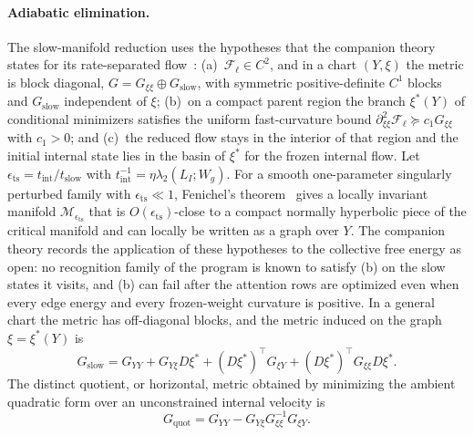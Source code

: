 \documentclass[11pt]{article}
\begin{document}
\paragraph{Adiabatic elimination.}
The slow-manifold reduction uses the hypotheses that the companion theory states for its rate-separated flow~\cite[Ch.~8]{DennisGaugeVFE2026}: (a)~$\mathcal{F}_\ell\in C^2$, and in a chart $(Y,\xi)$ the metric is block diagonal, $G=G_{\xi\xi}\oplus G_{\mathrm{slow}}$, with symmetric positive-definite $C^1$ blocks and $G_{\mathrm{slow}}$ independent of $\xi$; (b)~on a compact parent region the branch $\xi^*(Y)$ of conditional minimizers satisfies the uniform fast-curvature bound $\partial^2_{\xi\xi}\mathcal{F}_\ell\succeq c_1G_{\xi\xi}$ with $c_1>0$; and (c)~the reduced flow stays in the interior of that region and the initial internal state lies in the basin of $\xi^*$ for the frozen internal flow. Let $\epsilon_{\mathrm{ts}}=t_{\mathrm{int}}/t_{\mathrm{slow}}$ with $t_{\mathrm{int}}^{-1}=\eta\lambda_2(L_I;W_g)$. For a smooth one-parameter singularly perturbed family with $\epsilon_{\mathrm{ts}}\ll1$, Fenichel's theorem~\cite{fenichel1979geometric} gives a locally invariant manifold $\mathcal{M}_{\epsilon_{\mathrm{ts}}}$ that is $O(\epsilon_{\mathrm{ts}})$-close to a compact normally hyperbolic piece of the critical manifold and can locally be written as a graph over $Y$. The companion theory records the application of these hypotheses to the collective free energy as open: no recognition family of the program is known to satisfy (b) on the slow states it visits, and (b) can fail after the attention rows are optimized even when every edge energy and every frozen-weight curvature is positive. In a general chart the metric has off-diagonal blocks, and the metric induced on the graph $\xi=\xi^*(Y)$ is
\begin{equation}
G_{\mathrm{slow}}=G_{YY}+G_{Y\xi}D\xi^*+(D\xi^*)^\top G_{\xi Y}+(D\xi^*)^\top G_{\xi\xi}D\xi^*.
\label{eq:rg_slow_graph_metric}
\end{equation}
The distinct quotient, or horizontal, metric obtained by minimizing the ambient quadratic form over an unconstrained internal velocity is
\begin{equation}
G_{\mathrm{quot}}=G_{YY}-G_{Y\xi}G_{\xi\xi}^{-1}G_{\xi Y}.
\end{equation}
\end{document}
